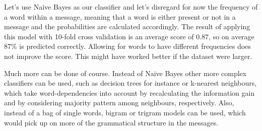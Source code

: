 \documentclass{llncs}
\begin{document}
Let's use Naive Bayes as our classifier and let's disregard for now the frequency of a word within a message, meaning that a word is either present or not in a message and the probabilities are calculated accordingly. The result of applying this model with 10-fold cross validation is an average score of $0.87$, so on average $87\%$ is predicted correctly. Allowing for words to have different frequencies does not improve the score. This might have worked better if the dataset were larger.

Much more can be done of course. Instead of Naive Bayes other more complex classifiers can be used, such as decision trees for instance or k-nearest neighbours, which take word-dependencies into account by recalculating the information gain and by considering majority pattern among neighbours, respectively. Also, instead of a bag of single words, bigram or trigram models can be used, which would pick up on more of the grammatical structure in the messages.

                        


\end{document}
